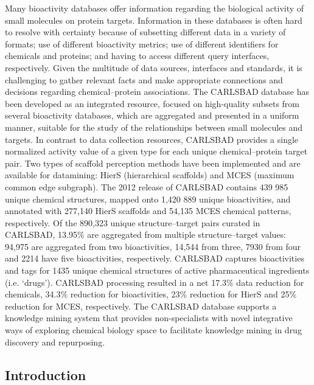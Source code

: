 Many bioactivity databases offer information regarding the biological activity of small molecules on protein targets. Information in these databases is often hard to resolve with certainty because of subsetting different data in a variety of formats; use of different bioactivity metrics; use of different identifiers for chemicals and proteins; and having to access different query interfaces, respectively. Given the multitude of data sources, interfaces and standards, it is challenging to gather relevant facts and make appropriate connections and decisions regarding chemical–protein associations. The CARLSBAD database has been developed as an integrated resource, focused on high-quality subsets from several bioactivity databases, which are aggregated and presented in a uniform manner, suitable for the study of the relationships between small molecules and targets. In contrast to data collection resources, CARLSBAD provides a single normalized activity value of a given type for each unique chemical–protein target pair. Two types of scaffold perception methods have been implemented and are available for datamining: HierS (hierarchical scaffolds) and MCES (maximum common edge subgraph). The 2012 release of CARLSBAD contains 439 985 unique chemical structures, mapped onto 1,420 889 unique bioactivities, and annotated with 277,140 HierS scaffolds and 54,135 MCES chemical patterns, respectively. Of the 890,323 unique structure–target pairs curated in CARLSBAD, 13.95\% are aggregated from multiple structure–target values: 94,975 are aggregated from two bioactivities, 14,544 from three, 7930 from four and 2214 have five bioactivities, respectively. CARLSBAD captures bioactivities and tags for 1435 unique chemical structures of active pharmaceutical ingredients (i.e. ‘drugs’). CARLSBAD processing resulted in a net 17.3\% data reduction for chemicals, 34.3\% reduction for bioactivities, 23\% reduction for HierS and 25\% reduction for MCES, respectively. The CARLSBAD database supports a knowledge mining system that provides non-specialists with novel integrative ways of exploring chemical biology space to facilitate knowledge mining in drug discovery and repurposing.

\subsection{Introduction}


